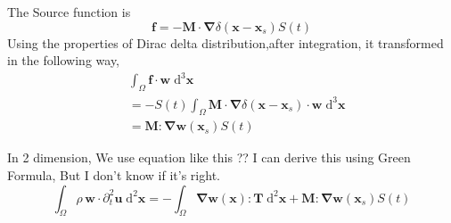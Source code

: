 \documentclass{book}
\begin{document}
The Source function is 
\begin{equation}
 \boldsymbol{f} = -\boldsymbol{M}\cdot\boldsymbol\nabla\delta(\boldsymbol x-\boldsymbol x_s)S(t)
\end{equation}
Using the properties of Dirac delta distribution,after integration, it transformed in the following way,
\begin{equation}
\begin{aligned}
 &\int_\Omega \boldsymbol f\cdot \boldsymbol w\;\mathrm{d}^3\boldsymbol x\\
 &= -S(t)\int_\Omega\boldsymbol{M}\cdot \boldsymbol\nabla\delta(\boldsymbol x-\boldsymbol x_s)\cdot \boldsymbol w\;\mathrm{d}^3\boldsymbol x\\
 &= \boldsymbol{M}:\boldsymbol{\nabla w}(\boldsymbol x_s)S (t)
\end{aligned}
\end{equation}

In 2 dimension, We use equation like this ?? I can derive this using Green Formula, But I don't know if it's right. 
\begin{equation}
 \int_\Omega \rho\,\boldsymbol w\cdot \partial_t^2\boldsymbol u\;\mathrm{d}^2\boldsymbol x = -\int_\Omega \boldsymbol{\nabla}\boldsymbol w(\boldsymbol x): \boldsymbol T\;\mathrm{d}^2\boldsymbol x + \boldsymbol{M}:\boldsymbol{\nabla w}(\boldsymbol x_s)S (t)
\end{equation}








  
\end{document}
